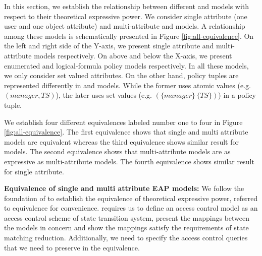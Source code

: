 
\label{sec:equivalence}



In this section, we establish the relationship between different \EPModels{} and \LPModels{} models with respect to their theoretical expressive power. We consider single attribute (one user and one object attribute) and multi-attribute \EPModels{} and \LPModels{} models. A relationship among these models is  schematically presented in Figure \ref{fig:all-equivalence}. On the left and right side of the Y-axis, we present single attribute and multi-attribute  models respectively. On above and below the X-axis, we present enumerated and logical-formula policy models respectively. In all these models, we only consider set valued attributes. On the other hand, policy tuples are represented differently in \EPOneOneModels{} and \EPMNModel{} models. While the former uses atomic values (e.g. $(manager,TS)$),  the later uses set values (e.g. $(\{manager\}\,\{TS\})$) in a policy tuple.

We establish four different equivalences labeled number one to four in Figure \ref{fig:all-equivalence}. The first  equivalence  shows  that single and multi attribute \EPModels{} models are equivalent whereas the third equivalence shows similar result for  \LPModels{} models. The second equivalence shows that multi-attribute \EPModels{} models are as expressive as multi-attribute \LPModels{} models. The fourth equivalence shows similar result for single attribute. 



\textbf{Equivalence of single and multi attribute EAP models:}  We follow the foundation of  \cite{tripli}   to establish the equivalence of theoretical expressive power, referred to \TL{} equivalence for convenience. \TL{} requires us to define an access control model as an access control scheme of state transition system, present the mappings between the models in concern and show the mappings satisfy the requirements of state matching reduction. Additionally, we need to specify the access control queries that we need to preserve in the equivalence. 


